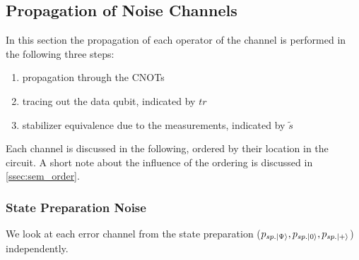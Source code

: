 




\subsection{Propagation of Noise Channels}\label{ssec:sem_propagation_of_channels}

In this section the propagation of each operator of the channel is performed in the following three steps: 
\begin{enumerate}
    \item propagation through the CNOTs
    \item tracing out the data qubit, indicated by $tr$
    \item stabilizer equivalence due to the measurements, indicated by $\tilde{s}$
\end{enumerate} 
Each channel is discussed in the following, ordered by their location in the circuit.
A short note about the influence of the ordering is discussed in \ref{ssec:sem_order}.


\subsubsection{State Preparation Noise}

We look at each error channel from the state preparation ($p_{sp.\ket{\Psi}},p_{sp.\ket{0}},p_{sp.\ket{+}}$) independently. 

